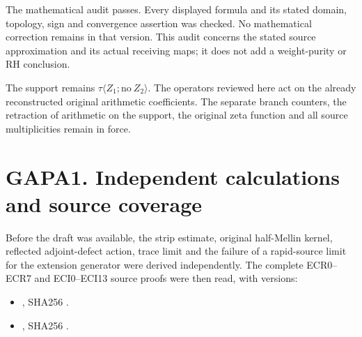 The mathematical audit passes. Every displayed formula and its stated
domain, topology, sign and convergence assertion was checked. No
mathematical correction remains in that version. This audit concerns the
stated source approximation and its actual receiving maps; it does not
add a weight-purity or RH conclusion.

The support remains \(\tau\langle Z_1;\mathrm{no}\ Z_2\rangle\). The
operators reviewed here act on the already reconstructed original
arithmetic coefficients. The separate branch counters, the retraction of
arithmetic on the support, the original zeta function and all source
multiplicities remain in force.

\section{GAPA1. Independent calculations and source
coverage}\label{gapa1.-independent-calculations-and-source-coverage}

Before the draft was available, the strip estimate, original half-Mellin
kernel, reflected adjoint-defect action, trace limit and the failure of
a rapid-source limit for the extension generator were derived
independently. The complete ECR0--ECR7 and ECI0--ECI13 source proofs
were then read, with versions:

\begin{itemize}
\tightlist
\item
  \href{https://github.com/KokunoYumeto/zeta-function-research-reader/blob/main/workbenches/splitzero-tandem/continuations/20260925-full-source-tensor-and-original-divisor/gct/EXTENSION_CLASS_TO_ORIGINAL_RESIDUE.md}{},
  SHA256
  .
\item
  \href{https://github.com/KokunoYumeto/zeta-function-research-reader/blob/main/workbenches/splitzero-tandem/continuations/20260925-full-source-tensor-and-original-divisor/gct/EXTENSION_CLASS_INVOLUTION_INDEPENDENT.md}{},
  SHA256
  .
\end{itemize}

